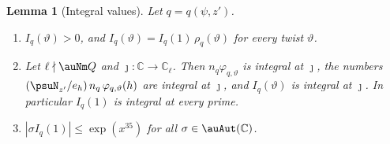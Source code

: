 \documentclass[10pt]{amsart}
\newtheorem{lemma}[theorem]{Lemma}
\theoremstyle{definition}
\theoremstyle{remark}
\newcommand{\C}{\mathbb C}
\begin{document}
\begin{lemma}[Integral values]\label{psu:I}
Let $q=q(\psi,z')$.
\begin{enumerate}
\item[(a)] $I_q(\vartheta)>0$, and $I_q(\vartheta)=I_q(1)\,\rho_q(\vartheta)$ for every twist $\vartheta$.
\item[(b)] Let $\ell\nmid\auNm Q$ and $\jmath\colon\C\to\C_\ell$. Then $n_q\varphi_{q,\vartheta}$ is
integral at $\jmath$, the numbers $(\psuN_{z'}/e_h)\,n_q\,\varphi_{q,\vartheta}(h)$ are integral at
$\jmath$, and $I_q(\vartheta)$ is integral at $\jmath$. In particular $I_q(1)$ is integral at every
prime.
\item[(c)] $|\sigma I_q(1)|\le\exp(x^{35})$ for all $\sigma\in\auAut(\C)$.
\end{enumerate}
\end{lemma}
\end{document}

